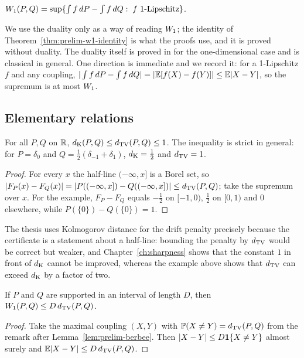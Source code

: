 \documentclass[../../../main.tex]{subfiles}
\begin{document}
\begin{proposition}\label{prop:prelim-kr}
$W_1(P,Q)=\sup\{\int f\,dP-\int f\,dQ:\;f\text{ 1-Lipschitz}\}$.
\end{proposition}

We use the duality only as a way of reading $W_1$; the identity of Theorem~\ref{thm:prelim-w1-identity} is what the proofs use, and it is proved without duality. The duality itself is proved in \cite{bobkov2019} for the one-dimensional case and is classical in general. One direction is immediate and we record it: for a 1-Lipschitz $f$ and any coupling, $|\int f\,dP-\int f\,dQ|=|\mathbb{E}[f(X)-f(Y)]|\le\mathbb{E}|X-Y|$, so the supremum is at most $W_1$.

\subsection{Elementary relations}

\begin{proposition}\label{prop:prelim-dK-le-dTV}
For all $P,Q$ on $\mathbb{R}$, $d_{\mathrm{K}}(P,Q)\le d_{\mathrm{TV}}(P,Q)\le1$. The inequality is strict in general: for $P=\delta_0$ and $Q=\tfrac12(\delta_{-1}+\delta_1)$, $d_{\mathrm{K}}=\tfrac12$ and $d_{\mathrm{TV}}=1$.
\end{proposition}

\begin{proof}
For every $x$ the half-line $(-\infty,x]$ is a Borel set, so $|F_P(x)-F_Q(x)|=|P((-\infty,x])-Q((-\infty,x])|\le d_{\mathrm{TV}}(P,Q)$; take the supremum over $x$. For the example, $F_P-F_Q$ equals $-\tfrac12$ on $[-1,0)$, $\tfrac12$ on $[0,1)$ and $0$ elsewhere, while $P(\{0\})-Q(\{0\})=1$.
\end{proof}

The thesis uses Kolmogorov distance for the drift penalty precisely because the certificate is a statement about a half-line: bounding the penalty by $d_{\mathrm{TV}}$ would be correct but weaker, and Chapter~\ref{ch:sharpness} shows that the constant $1$ in front of $d_{\mathrm{K}}$ cannot be improved, whereas the example above shows that $d_{\mathrm{TV}}$ can exceed $d_{\mathrm{K}}$ by a factor of two.

\begin{proposition}\label{prop:prelim-tv-w1}
If $P$ and $Q$ are supported in an interval of length $D$, then $W_1(P,Q)\le D\,d_{\mathrm{TV}}(P,Q)$.
\end{proposition}

\begin{proof}
Take the maximal coupling $(X,Y)$ with $\mathbb{P}(X\ne Y)=d_{\mathrm{TV}}(P,Q)$ from the remark after Lemma~\ref{lem:prelim-berbee}. Then $|X-Y|\le D\mathbf{1}\{X\ne Y\}$ almost surely and $\mathbb{E}|X-Y|\le D\,d_{\mathrm{TV}}(P,Q)$.
\end{proof}
\end{document}
